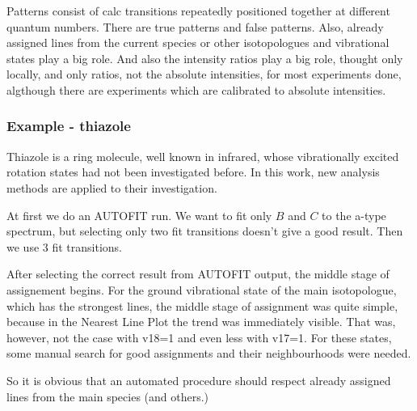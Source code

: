 \documentclass[11pt]{article}
\begin{document}
Patterns consist of calc transitions repeatedly positioned together at different quantum numbers. There are true patterns and false patterns. Also, already assigned lines from the current species or other isotopologues and vibrational states play a big role. And also the intensity ratios play a big role, thought only locally, and only ratios, not the absolute intensities, for most experiments done, algthough there are experiments which are calibrated to absolute intensities.
 
\subsubsection{Example - thiazole}

Thiazole is a ring molecule, well known in infrared, whose vibrationally excited rotation states had not been investigated before. In this work, new analysis methods are applied to their investigation.

At first we do an AUTOFIT run. We want to fit only $B$ and $C$ to the a-type spectrum, but selecting only two fit transitions doesn't give a good result.  Then we use $3$ fit transitions. 

After selecting the correct result from AUTOFIT output, the middle stage of assignement begins. For the ground vibrational state of the main isotopologue, which has the strongest lines, the middle stage of assignment was quite simple, because in the Nearest Line Plot the trend was immediately visible. That was, however, not the case with v18=1 and even less with v17=1. For these states, some manual search for good assignments and their neighbourhoods were needed.

So it is obvious that an automated procedure should respect already assigned lines from the main species (and others.)

\end{document}
